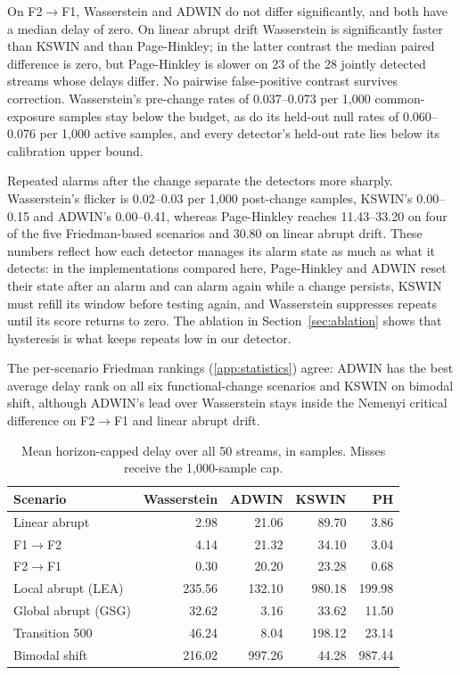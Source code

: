 \documentclass[preprint,12pt]{elsarticle}
\begin{document}
On F2$\to$F1, Wasserstein and ADWIN do not differ significantly, and both have a median delay of zero. On linear abrupt drift Wasserstein is significantly faster than KSWIN and than Page-Hinkley; in the latter contrast the median paired difference is zero, but Page-Hinkley is slower on 23 of the 28 jointly detected streams whose delays differ. No pairwise false-positive contrast survives correction. Wasserstein's pre-change rates of 0.037--0.073 per 1,000 common-exposure samples stay below the budget, as do its held-out null rates of 0.060--0.076 per 1,000 active samples, and every detector's held-out rate lies below its calibration upper bound.

Repeated alarms after the change separate the detectors more sharply. Wasserstein's flicker is 0.02--0.03 per 1,000 post-change samples, KSWIN's 0.00--0.15 and ADWIN's 0.00--0.41, whereas Page-Hinkley reaches 11.43--33.20 on four of the five Friedman-based scenarios and 30.80 on linear abrupt drift. These numbers reflect how each detector manages its alarm state as much as what it detects: in the implementations compared here, Page-Hinkley and ADWIN reset their state after an alarm and can alarm again while a change persists, KSWIN must refill its window before testing again, and Wasserstein suppresses repeats until its score returns to zero. The ablation in Section~\ref{sec:ablation} shows that hysteresis is what keeps repeats low in our detector.

The per-scenario Friedman rankings (\ref{app:statistics}) agree: ADWIN has the best average delay rank on all six functional-change scenarios and KSWIN on bimodal shift, although ADWIN's lead over Wasserstein stays inside the Nemenyi critical difference on F2$\to$F1 and linear abrupt drift.


\begin{table}[htbp]\centering\small
\caption{Mean horizon-capped delay over all 50 streams, in samples. Misses receive the 1,000-sample cap.}\label{tab:capped}
\setlength{\tabcolsep}{5pt}\begin{tabular}{lrrrr}
\toprule
Scenario & Wasserstein & ADWIN & KSWIN & PH\\\midrule
Linear abrupt & 2.98 & 21.06 & 89.70 & 3.86\\
F1$\to$F2 & 4.14 & 21.32 & 34.10 & 3.04\\
F2$\to$F1 & 0.30 & 20.20 & 23.28 & 0.68\\
Local abrupt (LEA) & 235.56 & 132.10 & 980.18 & 199.98\\
Global abrupt (GSG) & 32.62 & 3.16 & 33.62 & 11.50\\
Transition 500 & 46.24 & 8.04 & 198.12 & 23.14\\
Bimodal shift & 216.02 & 997.26 & 44.28 & 987.44\\
\bottomrule
\end{tabular}\end{table}
\end{document}
